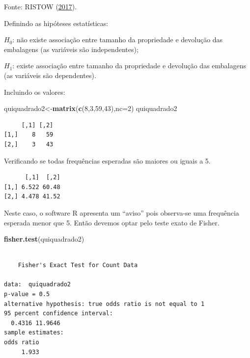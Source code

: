 \documentclass[12pt,brazil,oneside]{book}
\newenvironment{Shaded}{\begin{snugshade}}{\end{snugshade}}
\newcommand{\DataTypeTok}[1]{\textcolor[rgb]{0.13,0.29,0.53}{#1}}
\newcommand{\DecValTok}[1]{\textcolor[rgb]{0.00,0.00,0.81}{#1}}
\newcommand{\KeywordTok}[1]{\textcolor[rgb]{0.13,0.29,0.53}{\textbf{#1}}}
\newcommand{\NormalTok}[1]{#1}
\newcommand{\OperatorTok}[1]{\textcolor[rgb]{0.81,0.36,0.00}{\textbf{#1}}}
\begin{document}
Fonte: RISTOW (\protect\hyperlink{ref-Ristow2017}{2017}).

Definindo as hipóteses estatísticas:

\(H_0\): não existe associação entre tamanho da propriedade e devolução das embalagens (as variáveis são independentes);

\(H_1\): existe associação entre tamanho da propriedade e devolução das embalagens (as variáveis são dependentes).

Incluindo os valores:

\begin{Shaded}
\begin{Highlighting}[]
\NormalTok{quiquadrado2<-}\KeywordTok{matrix}\NormalTok{(}\KeywordTok{c}\NormalTok{(}\DecValTok{8}\NormalTok{,}\DecValTok{3}\NormalTok{,}\DecValTok{59}\NormalTok{,}\DecValTok{43}\NormalTok{),}\DataTypeTok{nc=}\DecValTok{2}\NormalTok{)}
\NormalTok{quiquadrado2}
\end{Highlighting}
\end{Shaded}

\begin{verbatim}
     [,1] [,2]
[1,]    8   59
[2,]    3   43
\end{verbatim}

Verificando se todas frequências esperadas são maiores ou iguais a 5.

\begin{Shaded}
\end{Shaded}

\begin{verbatim}
      [,1]  [,2]
[1,] 6.522 60.48
[2,] 4.478 41.52
\end{verbatim}

Neste caso, o software R apresenta um ``aviso'' pois observa-se uma frequência esperada menor que 5. Então devemos optar pelo teste exato de Fisher.

\begin{Shaded}
\begin{Highlighting}[]
\KeywordTok{fisher.test}\NormalTok{(quiquadrado2)}
\end{Highlighting}
\end{Shaded}

\begin{verbatim}

    Fisher's Exact Test for Count Data

data:  quiquadrado2
p-value = 0.5
alternative hypothesis: true odds ratio is not equal to 1
95 percent confidence interval:
  0.4316 11.9646
sample estimates:
odds ratio 
     1.933 
\end{verbatim}
\end{document}
